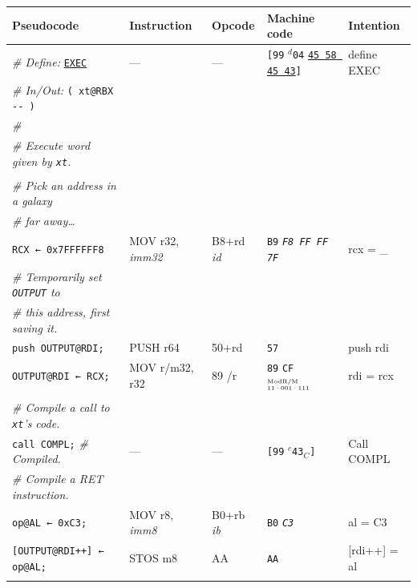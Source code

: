 \documentclass[a4paper,12pt,final]{article}
\begin{document}
\begin{table}[!htbp] \begin{adjustwidth}{-1cm}{-1cm} \fontsize{10}{12.000000}\selectfont
\begin{center}
\begin{tabular}{l|ll|lH}
\textbf{Pseudocode} & \textbf{Instruction} & \textbf{Opcode} & \textbf{Machine code} & \textbf{Intention}\\[0pt]
\hline
\emph{\# Define:} \uline{\texttt{EXEC}} & --- & --- & \texttt{[99} \(^{d}\)​\texttt{04} \uline{\texttt{45 58 45 43}}​\texttt{]} & define EXEC\\[0pt]
\emph{\# In/Out:} \texttt{( xt@RBX -{}-{} )} &  &  &  & \\[0pt]
\emph{\#} &  &  &  & \\[0pt]
\emph{\# Execute word given by \texttt{xt}.} &  &  &  & \\[0pt]
 &  &  &  & \\[0pt]
\emph{\# Pick an address in a galaxy} &  &  &  & \\[0pt]
\emph{\# far away\ldots{}} &  &  &  & \\[0pt]
\texttt{RCX ← 0x7FFFFFF8} & MOV r32, \emph{imm32} & B8+rd \emph{id} & \texttt{B9} \emph{\texttt{F8 FF FF 7F}} & rcx = \_\\[0pt]
\emph{\# Temporarily set \texttt{OUTPUT} to} &  &  &  & \\[0pt]
\emph{\# this address, first saving it.} &  &  &  & \\[0pt]
\texttt{push OUTPUT@RDI;} & PUSH r64 & 50+rd & \texttt{57} & push rdi\\[0pt]
\texttt{OUTPUT@RDI ← RCX;} & MOV r/m32, r32 & 89 /r & \texttt{89} \texttt{CF}​\(^{\text{\tiny ModR/M}}_{\text{\tiny 11·001·111}}\) & rdi = rcx\\[0pt]
 &  &  &  & \\[0pt]
\emph{\# Compile a call to \texttt{xt}'s code.} &  &  &  & \\[0pt]
\texttt{call COMPL;}  \emph{\# Compiled.} & --- & --- & \texttt{[99} \(^{c}\)​\texttt{43}​\(_{C}\)​\texttt{]} & Call COMPL\\[0pt]
\emph{\# Compile a RET instruction.} &  &  &  & \\[0pt]
\texttt{op@AL ← 0xC3;} & MOV r8, \emph{imm8} & B0+rb \emph{ib} & \texttt{B0} \emph{\texttt{C3}} & al = C3\\[0pt]
\texttt{[OUTPUT@RDI++] ← op@AL;} & STOS m8 & AA & \texttt{AA} & [rdi++] = al\\[0pt]
 &  &  &  & \\[0pt]

\end{tabular}
\end{center}
\end{adjustwidth}
\end{table}
\end{document}
